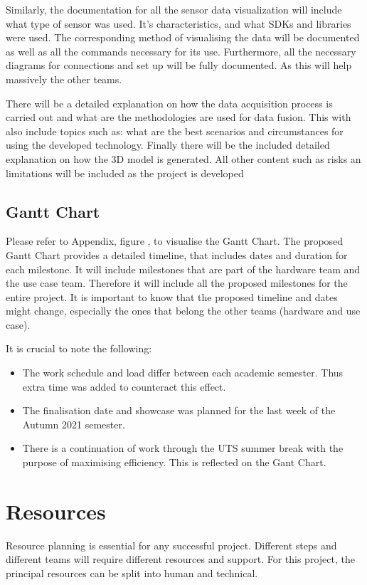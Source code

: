 \documentclass[12pt]{report}
\begin{document}
Similarly, the documentation for all the sensor data visualization will  include what type of sensor was used. It’s characteristics, and what SDKs and libraries were used. 
The corresponding method of visualising the data will be documented as well as all the commands necessary for its use. 
Furthermore, all the necessary diagrams for connections and set up will be fully documented. As this will help massively the other teams. 

There will be a detailed explanation on how the data acquisition process is carried out and what are the methodologies are used for data fusion. 
This  with  also include topics such as: what are the best scenarios and circumstances for using the developed technology. 
Finally there will be the included detailed explanation on how the 3D model is generated. 
All other content such as risks an limitations will be included as the project is developed

\subsection{Gantt Chart}
Please refer to Appendix, figure , to visualise the Gantt Chart. The proposed Gantt Chart  provides a detailed timeline, that includes dates and duration for each milestone. 
It will include milestones that are part of the hardware team and the use case team. Therefore it will include all the proposed milestones for the entire project. 
It is important to know that the proposed timeline and dates might change, especially the ones that belong the other teams (hardware and use case). 

It is crucial to note the following:
\begin{itemize}
  \item The work schedule and load differ between each academic semester. Thus extra time was added to counteract this effect.
  \item The finalisation date and showcase was planned for the last week of the Autumn 2021 semester. 
  \item There is a continuation of work through the UTS summer break with the purpose of maximising efficiency. This is reflected on the Gant Chart.
\end{itemize}

\section{Resources}
Resource planning is essential for any successful project. 
Different steps and different teams will require different resources and support. For this project, the principal resources can be split into human and technical. 
\end{document}
